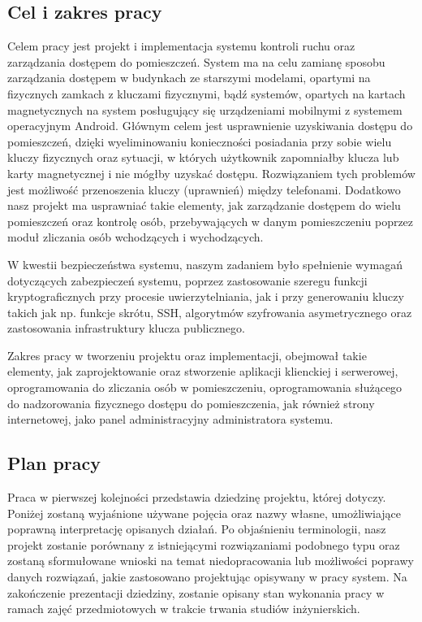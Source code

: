\subsection{Cel i zakres pracy}

Celem pracy jest projekt i implementacja systemu kontroli ruchu oraz zarządzania dostępem do pomieszczeń. System ma na celu zamianę sposobu zarządzania dostępem w budynkach ze starszymi modelami, opartymi na fizycznych zamkach z kluczami fizycznymi, bądź systemów, opartych na kartach magnetycznych na system posługujący się urządzeniami mobilnymi z systemem operacyjnym Android. Głównym celem jest usprawnienie uzyskiwania  dostępu do pomieszczeń, dzięki wyeliminowaniu konieczności posiadania przy sobie wielu kluczy fizycznych oraz sytuacji, w których użytkownik zapomniałby klucza lub karty magnetycznej i nie mógłby uzyskać dostępu. Rozwiązaniem tych problemów jest możliwość przenoszenia kluczy (uprawnień) między telefonami. 
Dodatkowo nasz projekt ma usprawniać takie elementy, jak zarządzanie dostępem do wielu pomieszczeń oraz kontrolę osób, przebywających w danym pomieszczeniu poprzez moduł zliczania osób wchodzących i wychodzących.
	
W kwestii bezpieczeństwa systemu, naszym zadaniem było spełnienie wymagań dotyczących zabezpieczeń systemu, poprzez zastosowanie szeregu funkcji kryptograficznych przy procesie uwierzytelniania, jak i przy generowaniu kluczy takich jak np. funkcje skrótu, SSH, algorytmów szyfrowania asymetrycznego oraz zastosowania infrastruktury klucza publicznego.

Zakres pracy w tworzeniu projektu oraz implementacji, obejmował takie elementy, jak zaprojektowanie oraz stworzenie aplikacji klienckiej i serwerowej, oprogramowania do zliczania osób w pomieszczeniu, oprogramowania służącego do nadzorowania fizycznego dostępu do pomieszczenia, jak również strony internetowej, jako panel administracyjny administratora systemu.

\newpage
\subsection{Plan pracy}
Praca w pierwszej kolejności przedstawia dziedzinę projektu, której dotyczy. Poniżej zostaną wyjaśnione używane pojęcia oraz nazwy własne, umożliwiające poprawną interpretację opisanych działań. Po objaśnieniu terminologii, nasz projekt zostanie porównany z istniejącymi rozwiązaniami podobnego typu oraz zostaną sformułowane wnioski na temat niedopracowania lub możliwości poprawy danych rozwiązań, jakie zastosowano projektując opisywany w pracy system. Na zakończenie prezentacji dziedziny, zostanie opisany stan wykonania pracy w ramach zajęć przedmiotowych w trakcie trwania studiów inżynierskich.

